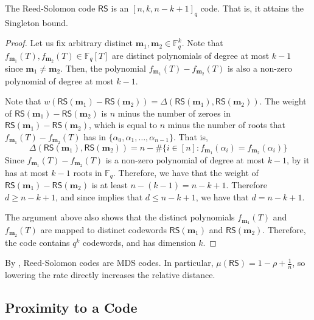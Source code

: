 \documentclass[../../book]{subfiles}
\begin{document}
\begin{proposition}\label{prop:rs-distance}
  The Reed-Solomon code $\mathsf{RS}$ is an $[n,k,n-k+1]_q$ code. That is, it attains the Singleton bound.
\end{proposition}
\begin{proof}
  Let us fix arbitrary distinct $\mathbf{m}_1, \mathbf{m}_2\in \mathbb{F}_q^k$. Note that $f_{\mathbf{m}_1}(T), f_{\mathbf{m}_2}(T)\in \mathbb{F}_q[T]$ are distinct polynomials of degree at most $k-1$ since $\mathbf{m}_1\neq \mathbf{m}_2$. Then, the polynomial $f_{\mathbf{m}_1}(T)-f_{\mathbf{m}_2}(T)$ is also a non-zero polynomial of degree at most $k-1$. 

  Note that $w(\mathsf{RS}(\mathbf{m}_1)-\mathsf{RS}(\mathbf{m}_2))=\Delta(\mathsf{RS}(\mathbf{m}_1), \mathsf{RS}(\mathbf{m}_2))$. The weight of $\mathsf{RS}(\mathbf{m}_1)-\mathsf{RS}(\mathbf{m}_2)$ is $n$ minus the number of zeroes in $\mathsf{RS}(\mathbf{m}_1)-\mathsf{RS}(\mathbf{m}_2)$, which is equal to $n$ minus the number of roots that $f_{\mathbf{m}_1}(T)-f_{\mathbf{m}_2}(T)$ has in $\{\alpha_0, \alpha_1, \ldots, \alpha_{n-1}\}$. That is,
  \begin{equation*}
    \Delta(\mathsf{RS}(\mathbf{m}_1), \mathsf{RS}(\mathbf{m}_2)) = n - \#\{i \in [n] : f_{\mathbf{m}_1}(\alpha_i)=f_{\mathbf{m}_2}(\alpha_i)\}
  \end{equation*}
  Since $f_{\mathbf{m}_1}(T)-f_{\mathbf{m}_2}(T)$ is a non-zero polynomial of degree at most $k-1$, by  it has at most $k-1$ roots in $\mathbb{F}_q$.
  Therefore, we have that the weight of $\mathsf{RS}(\mathbf{m}_1)-\mathsf{RS}(\mathbf{m}_2)$ is at least $n-(k-1)=n-k+1$. Therefore $d\geq n-k+1$, and since  implies that $d\leq n-k+1$, we have that $d=n-k+1$.

  The argument above also shows that the distinct polynomials $f_{\mathbf{m}_1}(T)$ and $f_{\mathbf{m}_2}(T)$ are mapped to distinct codewords $\mathsf{RS}(\mathbf{m}_1)$ and $\mathsf{RS}(\mathbf{m}_2)$. Therefore, the code contains $q^k$ codewords, and has dimension $k$.
\end{proof}

\begin{remark}
  By , Reed-Solomon codes are MDS codes. In particular,
  $\mu(\mathsf{RS}) = 1 - \rho + \frac{1}{n}$, so lowering the rate directly increases the relative distance.
\end{remark}

\subsection{Proximity to a Code}\label{subsec:proximity}
\end{document}
